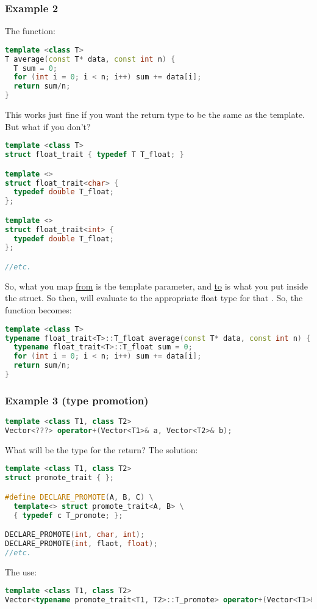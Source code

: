 \subsubsection{Example 2}

The  function:

\begin{lstlisting}[language=C++]
template <class T>
T average(const T* data, const int n) {
  T sum = 0;
  for (int i = 0; i < n; i++) sum += data[i];
  return sum/n;
}
\end{lstlisting}

This works just fine if you want the return type to be the same as the template. But what if you don't?

\begin{lstlisting}[language=C++]
template <class T>
struct float_trait { typedef T T_float; }

template <>
struct float_trait<char> {
  typedef double T_float;
};

template <>
struct float_trait<int> {
  typedef double T_float;
};

//etc.
\end{lstlisting}

So, what you map \underline{from} is the template parameter, and \underline{to} is what you put inside the struct. So then,  will evaluate to the appropriate float type for that . So, the  function becomes:

\begin{lstlisting}[language=C++]
template <class T>
typename float_trait<T>::T_float average(const T* data, const int n) {
  typename float_trait<T>::T_float sum = 0;
  for (int i = 0; i < n; i++) sum += data[i];
  return sum/n;
}
\end{lstlisting}


\subsubsection{Example 3 (type promotion)}

\begin{lstlisting}[language=C++]
template <class T1, class T2>
Vector<???> operator+(Vector<T1>& a, Vector<T2>& b);
\end{lstlisting}

What will be the type for the return? The solution:

\begin{lstlisting}[language=C++]
template <class T1, class T2>
struct promote_trait { };

#define DECLARE_PROMOTE(A, B, C) \
  template<> struct promote_trait<A, B> \
  { typedef c T_promote; };

DECLARE_PROMOTE(int, char, int);
DECLARE_PROMOTE(int, flaot, float);
//etc.
\end{lstlisting}

The use:

\begin{lstlisting}[language=C++]
template <class T1, class T2>
Vector<typename promote_trait<T1, T2>::T_promote> operator+(Vector<T1>& a, Vector<T2> b);
\end{lstlisting}

